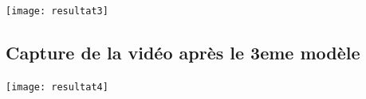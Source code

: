 \documentclass[14pt, oneside]{article} %
\begin{document}
				\texttt{[image: resultat3]}
		
		\subsection{Capture de la vid\'{e}o  apr\`{e}s le 3eme  mod\`{e}le}
		
				\texttt{[image: resultat4]}
	
		
	
	\newpage
	\nocite{*}
	
	
\end{document}
